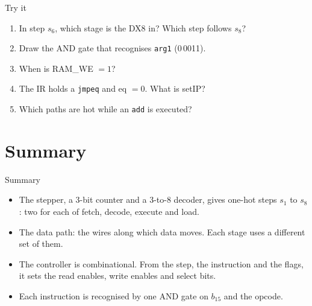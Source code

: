 \documentclass[10pt]{wosm-slides}
\begin{document}
\begin{frame}{Try it}
  \begin{enumerate}
    \item In step $s_6$, which stage is the DX8 in? Which step follows $s_8$?\par
    \item Draw the AND gate that recognises \texttt{arg1} (0\,0011).\par
    \item When is RAM\_WE $= 1$?\par
    \item The IR holds a \texttt{jmpeq} and eq $= 0$. What is setIP?\par
    \item Which paths are hot while an \texttt{add} is executed?\par
  \end{enumerate}
\end{frame}

\section{Summary}

\begin{frame}{Summary}
  \begin{itemize}
    \item The stepper, a 3-bit counter and a 3-to-8 decoder, gives one-hot steps
      $s_1$ to $s_8$: two for each of fetch, decode, execute and load.
    \item The data path: the wires along which data moves. Each stage uses a
      different set of them.
    \item The controller is combinational. From the step, the instruction and the
      flags, it sets the read enables, write enables and select bits.
    \item Each instruction is recognised by one AND gate on $b_{15}$ and the opcode.
  \end{itemize}
\end{frame}
\end{document}
